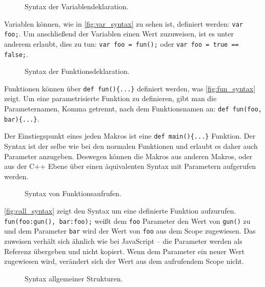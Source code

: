     \begin{figure}[H]
      \centering
      
      \caption{Syntax der Variablendeklaration.}
      \label{fig:var_syntax}
    \end{figure}
    Variablen können, wie in \autoref{fig:var_syntax} zu sehen ist, definiert werden: \lstinline[style=MyMacroStyle]$var foo;$. Um anschließend der Variablen einen Wert zuzuweisen, ist es unter anderem erlaubt, dies zu tun: \lstinline[style=MyMacroStyle]$var foo = fun();$ oder \lstinline[style=MyMacroStyle]$var foo = true == false;$.

    \begin{figure}[H]
      \centering
      
      \caption{Syntax der Funktionsdeklaration.}
      \label{fig:fun_syntax}
    \end{figure}
    Funktionen können über \lstinline[style=MyMacroStyle]$def fun(){...}$ definiert werden, was \autoref{fig:fun_syntax} zeigt. Um eine parametrisierte Funktion zu definieren, gibt man die Parameternamen, Komma getrennt, nach dem Funktionsnamen an: \lstinline[style=MyMacroStyle]$def fun(foo, bar){...}$.

    Der Einstiegspunkt eines jeden Makros ist eine \lstinline[style=MyMacroStyle]$def main(){...}$ Funktion. Der Syntax ist der selbe wie bei den normalen Funktionen und erlaubt es daher auch Parameter anzugeben. Deswegen können die Makros aus anderen Makros, oder aus der C++ Ebene über einen äquivalenten Syntax mit Parametern aufgerufen werden.

    \begin{figure}[H]
      \centering
      
      \caption{Syntax von Funktionsaufrufen.}
      \label{fig:call_syntax}
    \end{figure}
    \autoref{fig:call_syntax} zeigt den Syntax um eine definierte Funktion aufzurufen. \lstinline[style=MyMacroStyle]$fun(foo:gun(), bar:foo);$ weißt dem \lstinline[style=MyMacroStyle]$foo$ Parameter den Wert von \lstinline[style=MyMacroStyle]$gun()$ zu und dem Parameter \lstinline[style=MyMacroStyle]$bar$ wird der Wert von \lstinline[style=MyMacroStyle]$foo$ aus dem Scope zugewiesen. Das zuweisen verhält sich ähnlich wie bei JavaScript -- die Parameter werden als Referenz übergeben und nicht kopiert. Wenn dem Parameter ein neuer Wert zugewiesen wird, verändert sich der Wert aus dem aufrufendem Scope nicht.

    \begin{figure}[H]
      \centering
      
      \caption{Syntax allgemeiner Strukturen.}
      \label{fig:common_syntax}
    \end{figure}

